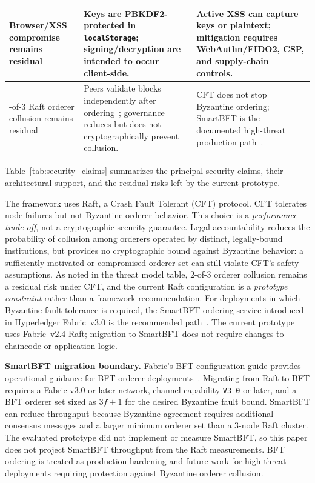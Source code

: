 \documentclass{ieeeaccess}
\begin{document}
\begin{table}[!t]
\begin{tabularx}{\columnwidth}{|>{\RaggedRight\arraybackslash}p{1.25cm}|>{\RaggedRight\arraybackslash}p{2.55cm}|>{\RaggedRight\arraybackslash}X|}
\hline
Browser/XSS compromise remains residual &
Keys are PBKDF2-protected in \texttt{localStorage}; signing/decryption are intended to occur client-side. &
Active XSS can capture keys or plaintext; mitigation requires WebAuthn/FIDO2, CSP, and supply-chain controls. \\
\hline
2-of-3 Raft orderer collusion remains residual &
Peers validate blocks independently after ordering~\cite{androulaki2018hyperledger}; governance reduces but does not cryptographically prevent collusion. &
CFT does not stop Byzantine ordering; SmartBFT is the documented high-threat production path~\cite{fabricWhatsNew3x,fabricBFTConfigurationDoc}. \\
\hline
\end{tabularx}
\end{table}

Table~\ref{tab:security_claims} summarizes the principal security claims, their architectural support, and the residual risks left by the current prototype.

The framework uses Raft, a Crash Fault
Tolerant (CFT) protocol. CFT tolerates node failures but not
Byzantine orderer behavior. This choice is a \emph{performance
trade-off}, not a cryptographic security guarantee. Legal
accountability reduces the probability of collusion among orderers
operated by distinct, legally-bound institutions, but provides no
cryptographic bound against Byzantine behavior: a sufficiently
motivated or compromised orderer set can still violate CFT's safety
assumptions. As noted in the threat model table, 2-of-3 orderer
collusion remains a residual risk under CFT, and the current Raft
configuration is a \emph{prototype constraint} rather than a
framework recommendation. For deployments in which Byzantine fault
tolerance is required, the SmartBFT ordering service introduced in
Hyperledger Fabric~v3.0 is the recommended
path~\cite{fabricWhatsNew3x,fabricOrderingServiceLatest,fabricBFTConfigurationDoc,androulaki2018hyperledger}. The current
prototype uses Fabric~v2.4 Raft; migration to SmartBFT does not
require changes to chaincode or application logic.

\textbf{SmartBFT migration boundary.} Fabric's BFT configuration
guide provides operational guidance for BFT orderer deployments~\cite{fabricBFTConfigurationDoc}. Migrating from Raft to BFT requires
a Fabric v3.0-or-later network, channel capability \texttt{V3\_0} or
later, and a BFT orderer set sized as $3f+1$ for the desired Byzantine
fault bound. SmartBFT can reduce throughput because Byzantine
agreement requires additional consensus messages and a larger minimum
orderer set than a 3-node Raft cluster. The evaluated
prototype did not implement or measure SmartBFT, so this paper does
not project SmartBFT throughput from the Raft measurements. BFT
ordering is treated as production hardening and future work for
high-threat deployments requiring protection against Byzantine orderer
collusion.
\end{document}
